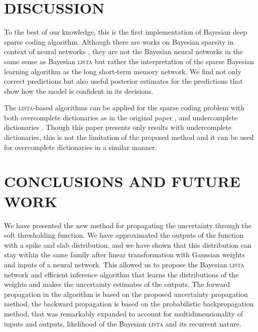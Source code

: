\documentclass[letterpaper]{article}
\begin{document}
\section{\uppercase{Discussion}}
\label{sec:discussion}
To the best of our knowledge, this is the first implementation of Bayesian deep sparse coding algorithm. Although there are works on Bayesian sparsity in context of neural networks \citep{he2017bayesian}, they are not the Bayesian neural networks in the same sense as Bayesian \textsc{lista} but rather the interpretation of the sparse Bayesian  learning algorithm as the long short-term memory network. We find not only correct predictions but also useful posterior estimates for the predictions that show how the model is confident in its decisions. 


The \textsc{lista}-based algorithms can be applied for the sparse coding problem with both overcomplete dictionaries as in the original paper \citep{gregor2010learning}, and undercomplete dictionaries \citep{borgerding2017amp}. Though this paper presents only results with undercomplete dictionaries, this is not the limitation of the proposed method and it can be used for overcomplete dictionaries in a similar manner.

\section{\uppercase{Conclusions and future work}}
\label{sec:conclusions}
We have presented the new method for propagating the uncertainty through the soft thresholding function. %
We have approximated the outputs of the function with a spike and slab distribution, and we have shown that this distribution can stay within the same family after linear transformation with Gaussian weights and inputs of a neural network. This allowed us to propose the Bayesian \textsc{lista} network and efficient inference algorithm that learns the distributions of the weights and makes the uncertainty estimates of the outputs. The forward propagation in the algorithm is based on the proposed uncertainty propagation method, the backward propagation is based on the probabilistic backpropagation method, that was remarkably expanded to account for multidimensionality of inputs and outputs, likelihood of the Bayesian \textsc{lista} and its recurrent nature.
\end{document}
